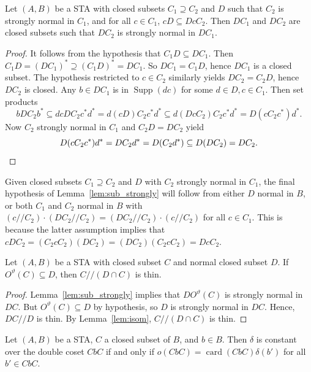 \documentclass[ALCO,ThmDefs,Unicode,epreuves]{cedram}
\DeclareMathOperator{\card}{card}
\DeclareMathOperator{\Supp}{Supp}
\begin{document}
\begin{lemm}
\label{lem:sub_strongly}
Let $(A, B)$ be a STA with closed subsets $C_1 \supseteq C_2$ and $D$
such that 
$C_2$ is strongly normal in $C_1$, and for all $c \in C_1$, $cD
\subseteq DcC_2$. 
 Then $DC_1$ and
$DC_2$ are closed subsets such that $DC_2$ is
strongly normal in $DC_1$.
\end{lemm} 

\begin{proof} 
It follows from the hypothesis that $C_1D \subseteq DC_1$. Then $C_1D =
(DC_1)^* \supseteq (C_1D)^* = DC_1$. So $DC_1 = C_1D$, hence $DC_1$ is
a closed subset. 
The hypothesis restricted to $c \in C_2$ similarly yields $DC_2 = C_2D$,
hence $DC_2$ is closed. 
Any $b \in DC_1$ is in $\Supp(dc)$ for some $d \in D, c \in C_1$. Then
set products 
\[
bDC_2b^* \subseteq dcDC_2c^*d^* = d(cD)C_2c^*d^* \subseteq
d(DcC_2)C_2c^*d^* = D(cC_2c^*)d^*.
\] 
Now $C_2$ strongly normal in $C_1$ and $C_2D = DC_2$ yield
\[
D(cC_2c^*)d^* = DC_2d^* = D(C_2d^*) \subseteq D(DC_2) = DC_2.\qedhere
\]
\end{proof}

\begin{rema}
\label{rem:hypoth}
Given closed subsets $C_1 \supseteq C_2$ and $D$ with $C_2$ strongly
normal in $C_1$, the final hypothesis of Lemma~\ref{lem:sub_strongly}
will follow from either $D$ normal in $B$, or both $C_1$ and $C_2$
normal in $B$ with $(c//C_2)\cdot(DC_2//C_2) =
(DC_2//C_2)\cdot(c//C_2)$ for all $c \in C_1$. This is because the latter assumption
implies that $cDC_2 = (C_2cC_2)(DC_2) = (DC_2)(C_2cC_2) = DcC_2$.
\end{rema}
 
\begin{lemm}
\label{lem:intersect}
Let $(A, B)$ be a STA with closed subset $C$ and normal closed subset
$D$. If $O^{\vartheta}(C) \subseteq D$, then $C//(D\cap C)$ is thin.
\end{lemm}

\begin{proof}
Lemma~\ref{lem:sub_strongly} implies that $DO^{\vartheta}(C)$ is
strongly normal in $DC$. But $O^{\vartheta}(C) \subseteq D$ by
hypothesis, so $D$ is strongly normal in $DC$. Hence, $DC//D$ is thin.
By Lemma~\ref{lem:isom}, $C//(D\cap C)$ is thin.
\end{proof}

\begin{lemm}
\label{lem:constant}
Let $(A, B)$ be a STA, $C$ a closed subset of $B$, and $b \in B$. Then
$\delta$ is constant over the double coset $CbC$ if and only if $o(CbC)
= \card(CbC)\delta(b')$ for all $b' \in CbC$.
\end{lemm}
\end{document}
